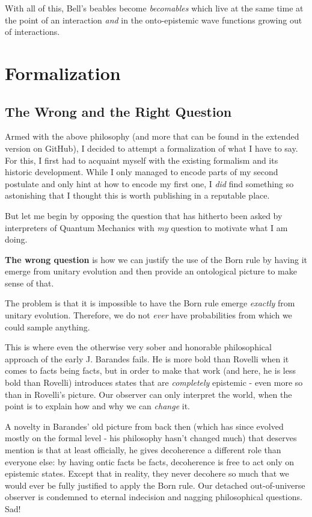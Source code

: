 \documentclass{article}
\begin{document}
With all of this, Bell's beables \cite{laudisa2023evolutionbellnotionbeable} become \textit{becomables} which live at the same time at the point of an interaction \textit{and} in the onto-epistemic wave functions growing out of interactions.

\section{Formalization}

\subsection{The Wrong and the Right Question}

Armed with the above philosophy (and more that can be found in the extended version on GitHub), I decided to attempt a formalization of what I have to say. For this, I first had to acquaint myself with the existing formalism and its historic development. While I only managed to encode parts of my second postulate and only hint at how to encode my first one, I \textit{did} find something so astonishing that I thought this is worth publishing in a reputable place.

But let me begin by opposing the question that has hitherto been asked by interpreters of Quantum Mechanics with \textit{my} question to motivate what I am doing.

\textbf{The wrong question} is how we can justify the use of the Born rule by having it emerge from unitary evolution and then provide an ontological picture to make sense of that.

The problem is that it is impossible to have the Born rule emerge \textit{exactly} from unitary evolution. Therefore, we do not \textit{ever} have probabilities from which we could sample anything.

This is where even the otherwise very sober and honorable philosophical approach of the early J. Barandes \cite{barandes2014minimalmodalinterpretationquantum} fails. He is more bold than Rovelli when it comes to facts being facts, but in order to make that work (and here, he is less bold than Rovelli) introduces states that are \textit{completely} epistemic - even more so than in Rovelli's picture. Our observer can only interpret the world, when the point is to explain how and why we can \textit{change} it.

A novelty in Barandes' old picture from back then (which has since evolved mostly on the formal level - his philosophy hasn't changed much) that deserves mention is that at least officially, he gives decoherence a different role than everyone else: by having ontic facts be facts, decoherence is free to act only on epistemic states. Except that in reality, they never decohere so much that we would ever be fully justified to apply the Born rule. Our detached out-of-universe observer is condemned to eternal indecision and nagging philosophical questions. Sad!
\end{document}
